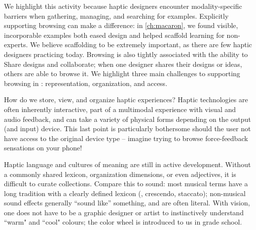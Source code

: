 We highlight this activity because haptic designers encounter modality-specific barriers when gathering, managing, and searching for examples.
Explicitly supporting browsing can make a difference:
in \autoref{ch:macaron}, we found visible, incorporable examples both eased design and helped scaffold learning for non-experts.
We believe scaffolding to be extremely important, as there are few haptic designers practicing today.
Browsing is also tightly associated with the ability to Share designs and collaborate; when one designer shares their designs or ideas, others are able to browse it.
We highlight three main challenges to supporting browsing in \haxd: representation, organization, and access.





    How do we store, view, and organize haptic experiences?
    Haptic technologies are often inherently interactive, part of a multimodal experience with visual and audio feedback, and can take a variety of physical forms depending on the output (and input) device.
    This last point is particularly bothersome should the user not have access to the original device type -- imagine trying to browse force-feedback sensations on your phone!

    Haptic language and cultures of meaning are still in active development.
    Without a commonly shared lexicon, organization dimensions, or even adjectives, it is difficult to curate collections.
    Compare this to sound: most musical terms have a long tradition with a clearly defined lexicon (\eg, crescendo, staccato); non-musical sound effects generally ``sound like'' something, and are often literal.
    With vision, one does not have to be a graphic designer or artist to instinctively understand ``warm" and ``cool" colours; the color wheel is introduced to us in grade school.  
    
